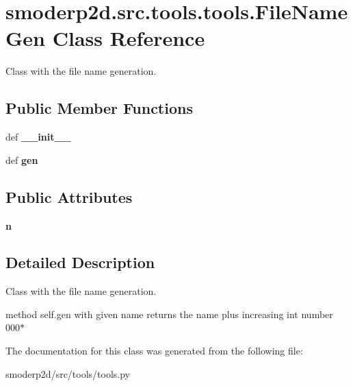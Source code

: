 \hypertarget{classsmoderp2d_1_1src_1_1tools_1_1tools_1_1FileNameGen}{\section{smoderp2d.\-src.\-tools.\-tools.\-File\-Name\-Gen Class Reference}
\label{classsmoderp2d_1_1src_1_1tools_1_1tools_1_1FileNameGen}
}


Class with the file name generation.  


\subsection*{Public Member Functions}
\begin{DoxyCompactItemize}
\item 
\hypertarget{classsmoderp2d_1_1src_1_1tools_1_1tools_1_1FileNameGen_a643b6c519d6395cc62f74e4dcc65cbe5}{def {\bfseries \-\_\-\-\_\-init\-\_\-\-\_\-}}\label{classsmoderp2d_1_1src_1_1tools_1_1tools_1_1FileNameGen_a643b6c519d6395cc62f74e4dcc65cbe5}

\item 
\hypertarget{classsmoderp2d_1_1src_1_1tools_1_1tools_1_1FileNameGen_a6ba5778ecc01d6ab70dbe4b476ab72ca}{def {\bfseries gen}}\label{classsmoderp2d_1_1src_1_1tools_1_1tools_1_1FileNameGen_a6ba5778ecc01d6ab70dbe4b476ab72ca}

\end{DoxyCompactItemize}
\subsection*{Public Attributes}
\begin{DoxyCompactItemize}
\item 
\hypertarget{classsmoderp2d_1_1src_1_1tools_1_1tools_1_1FileNameGen_a5da7416b45adcbab881ab48df88ed49f}{{\bfseries n}}\label{classsmoderp2d_1_1src_1_1tools_1_1tools_1_1FileNameGen_a5da7416b45adcbab881ab48df88ed49f}

\end{DoxyCompactItemize}


\subsection{Detailed Description}
Class with the file name generation. 

method self.\-gen with given name returns the name plus increasing int number 000$\ast$ 

The documentation for this class was generated from the following file\-:\begin{DoxyCompactItemize}
\item 
smoderp2d/src/tools/tools.\-py\end{DoxyCompactItemize}
